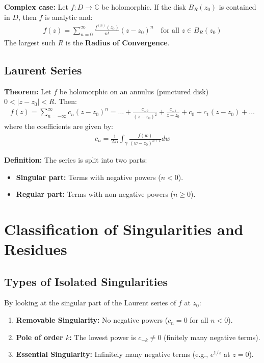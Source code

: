 \textbf{Complex case:} Let $f: D \rightarrow \mathbb{C}$ be holomorphic. If the disk $B_R(z_0)$ is contained in $D$, then $f$ is analytic and:
\begin{align*}
    f(z) = \sum_{n=0}^\infty \frac{f^{(n)}(z_0)}{n!}(z-z_0)^n \quad \text{for all } z \in B_R(z_0)
\end{align*}
The largest such $R$ is the \textbf{Radius of Convergence}.

\subsection{Laurent Series}
\textbf{Theorem:} Let $f$ be holomorphic on an annulus (punctured disk) $0 < |z-z_0| < R$. Then:
\begin{align*}
    f(z) = \sum_{n = -\infty}^\infty c_n(z-z_0)^n = \dots + \frac{c_{-2}}{(z-z_0)^2} + \frac{c_{-1}}{z-z_0} + c_0 + c_1(z-z_0) + \dots
\end{align*}
where the coefficients are given by:
\begin{align*}
    c_n = \frac{1}{2 \pi i}\int_\gamma \frac{f(w)}{(w-z_0)^{n+1}}dw
\end{align*}

\textbf{Definition:} The series is split into two parts:
\begin{itemize}
    \item \textbf{Singular part:} Terms with negative powers ($n < 0$).
    \item \textbf{Regular part:} Terms with non-negative powers ($n \geq 0$).
\end{itemize}

\section{Classification of Singularities and Residues}

\subsection{Types of Isolated Singularities}
By looking at the singular part of the Laurent series of $f$ at $z_0$:
\begin{enumerate}
    \item \textbf{Removable Singularity:} No negative powers ($c_n = 0$ for all $n < 0$).
    \item \textbf{Pole of order $k$:} The lowest power is $c_{-k} \neq 0$ (finitely many negative terms).
    \item \textbf{Essential Singularity:} Infinitely many negative terms (e.g., $e^{1/z}$ at $z=0$).
\end{enumerate}

